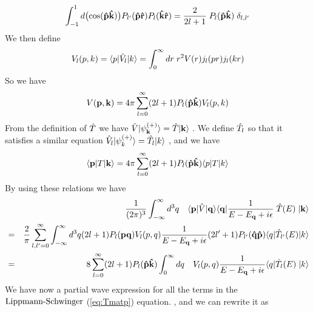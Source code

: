 \begin{equation}\label{eq:poly}  
 \int^{1}_{-1}d\big({\cos({\bf \op{p}\op{k}})}\big)P_{l'}({\bf \op{p}\op{r}})P_l({\bf \op{k}\op{r}})
 =\frac{2}{2l+1}\;P_{l}({\bf \op{p}\op{k}})\;\delta_{l,l'}
\end{equation}
%
We then define
%
\begin{equation}\label{eq:V_l_def}
V_l({ p},{ k})=\braketm{{ p}}{{\op{V}}_l}{{ k}}=
\int^{\infty}_{0}dr\;r^2 V(r) j_{l}(pr)j_{l}(kr) 
\end{equation}
%
So we have
%
\begin{equation}
V({\bf p},{\bf k})=
4\pi\sum^{\infty}_{l=0} (2l+1) P_{l}({\bf \hat{p}\hat{k}}) V_l({ p},{ k})
\end{equation}
%
From the definition of $\hat{T}$ we have $\hat{V}|\psi_{\bf k}^{(+)}\rangle=\hat{T}|{\bf k}\rangle $
. We define $\hat{T}_l$ so that it satisfies a similar equation
$\hat{V}_l|\psi_{ k}^{(+)}\rangle=\hat{T}_l|{ k}\rangle $\; , and we have
%
\begin{equation}\label{eq:TsomTm} 
\braketm{{\bf p}}{T}{{\bf k}}=
4\pi\sum^{\infty}_{l=0} (2l+1) P_{l}({\bf \op{p}\op{k}}) \braketm{{ p}}{T}{{ k}}
\end{equation}
%
By using these relations we have
%
\begin{eqnarray} 
&&\frac{1}{(2\pi)^3}\int^{\infty}_{-\infty}d^3 { q} \quad\langle{\bf p}|\hat{V}|{\bf q}\rangle\langle{\bf q}| 
\frac{1}{E-E_{\bf q}+i\epsilon}   \;\hat{T}(E)\;|{\bf k}\rangle 
\nonumber\\  
&=&
\frac{2}{\pi}\sum^{\infty}_{l,l'=0}\int^{\infty}_{-\infty}d^3 { q}
(2l+1)P_l({{\bf p}}{{\bf q}})V_{l}(p,q)
\frac{1}{E-E_{\bf q}+i\epsilon}
(2l'+1) P_{l'}({\bf \hat{q}\hat{p}})\langle q|\hat{T}_{l'}(E)|{ k}\rangle\nonumber\\
&=&
8\sum^{\infty}_{l=0}(2l+1) P_{l}({\bf \hat{p}\hat{k}})
\int^{\infty}_{0}dq\quad
V_{l}(p,q)\frac{1}{E-E_{\bf q}+i\epsilon}
\langle q|\hat{T}_{l}(E)\;|{ k}\rangle
\end{eqnarray}
%
We have now a  partial wave expression for all the terms in the $\text{Lippmann-Schwinger}$ (\ref{eq:Tmatp}) equation.
, and we can rewrite it as
%
